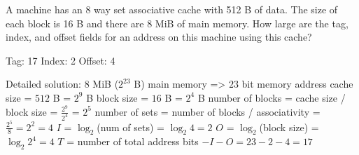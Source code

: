 \begin{blocksection}
\question
A machine has an 8 way set associative cache with 512 B of data. The size of each block is 16 B and there are 8 MiB of main memory. How large are the tag, index, and offset fields for an address on this machine using this cache?

\begin{solution}[0.7in]
Tag: ​17 Index: ​2 Offset: ​4

Detailed solution:
$8$ MiB ($2^23$ B) main memory => $23$ bit memory address
cache size = $512$ B = $2^9$ B
block size = $16$ B = $2^4$ B
number of blocks = cache size / block size = $\frac{2^9}{2^4}$ = $2^5$
number of sets = number of blocks / associativity = $\frac{2^5}{8} = 2^2 = 4$
$I$ = $\log_2$(num of sets) = $\log_2 4 = 2$
$O$ = $\log_2$(block size) = $\log_2 2^4 = 4$
$T$ = number of total address bits $- I - O = 23 - 2 - 4 = 17$
\end{solution}

\end{blocksection}